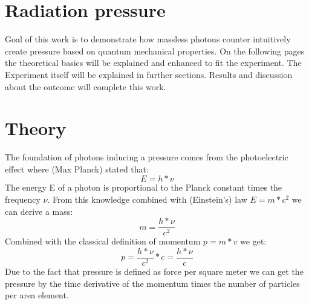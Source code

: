 \documentclass[12pt,a4paper]{article}
\begin{document}

\pagebreak
\setlength{\columnsep}{20pt}
\begin{multicols}{2}

\begin{abstract}

\end{abstract}

%

\section{Radiation pressure}
Goal of this work is to demonstrate how massless photons counter intuitively create pressure based on quantum mechanical
properties.
On the following pages the theoretical basics will be explained and enhanced to fit the experiment.
The Experiment itself will be explained in further sections. Results and discussion about the outcome
will complete this work.

\section{Theory}
The foundation of photons inducing a pressure comes from the photoelectric effect where (Max Planck) stated that:
$$E = h * \nu$$
The energy E of a photon is proportional to the Planck constant times the frequency $\nu$.
From this knowledge combined with (Einstein's) law $E = m * c^2$ we can derive a mass:
$$m = \frac{h * \nu}{c^2}$$
Combined with the classical definition of momentum $p = m * v$ we get:
$$p = \frac{h * \nu}{c^2} * c = \frac{h * \nu}{c}$$
Due to the fact that pressure is defined as force per square meter we can get the pressure by the time derivative of the momentum times the number of particles per area element.


\end{multicols}
\end{document}
